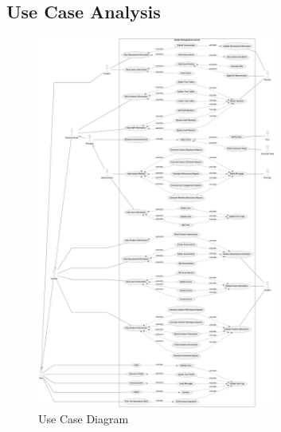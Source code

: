 \documentclass[12pt,a4paper]{report}
\begin{document}
\subsection{Use Case Analysis}
\begin{figure}[htbp]
    \centering
    \includegraphics[width=0.7\textwidth]{use-case-diagram.png}
    \caption{Use Case Diagram}
    \label{fig:use-case-diagram}
\end{figure}
\end{document}
